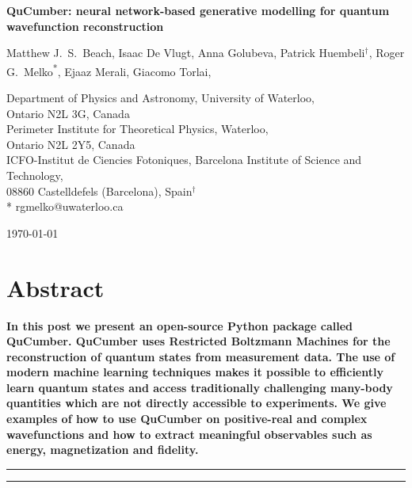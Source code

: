 \documentclass[submission, Phys]{SciPost}
\begin{document}
\begin{center}{\Large \textbf{
			QuCumber: neural network-based generative modelling for quantum wavefunction reconstruction
		}}\end{center}

\begin{center}
	Matthew J.~S.~Beach,
	Isaac De Vlugt,
	Anna Golubeva,
	Patrick Huembeli$^\dag$,
	Roger G.~Melko\textsuperscript{*},
	Ejaaz Merali,
	Giacomo Torlai,
\end{center}

\begin{center}
	Department of Physics and Astronomy, University of Waterloo,
	\\Ontario N2L 3G, Canada
	\\
	Perimeter Institute for Theoretical Physics, Waterloo,
	\\Ontario N2L 2Y5, Canada
	\\
	ICFO-Institut de Ciencies Fotoniques, Barcelona Institute of Science and Technology,
	\\08860 Castelldefels (Barcelona), Spain$^\dag$ \\
	* rgmelko@uwaterloo.ca \\
\end{center}

\begin{center}
	\today
\end{center}


\section*{Abstract}
{\bf
	In this post we present an open-source Python package called QuCumber.
	QuCumber uses Restricted Boltzmann Machines for the reconstruction of quantum states
	from measurement data. The use of modern machine learning techniques makes it possible
	to efficiently learn quantum states and access traditionally challenging many-body quantities
	which are not directly accessible to experiments. We give examples of how to use QuCumber
	on positive-real and complex wavefunctions and how to extract meaningful observables such as
	energy, magnetization and fidelity.
}

\vspace{10pt}
\noindent\rule{\textwidth}{1pt}
\tableofcontents\thispagestyle{fancy}
\noindent\rule{\textwidth}{1pt}
\vspace{10pt}
\end{document}
